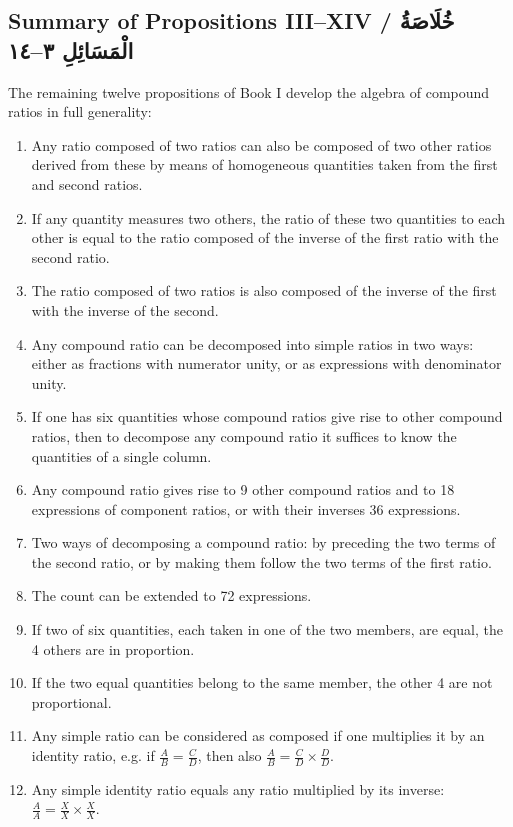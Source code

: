 \documentclass[11pt,a4paper]{article}
\theoremstyle{plain}
\theoremstyle{definition}
\theoremstyle{remark}
\newcommand{\ar}[1]{{\arabicfont\beginR #1\endR}}
\begin{document}
\subsection{Summary of Propositions III--XIV / \ar{خُلَاصَةُ الْمَسَائِلِ ٣--١٤}}
\label{sec:prop3-14}

\noindent The remaining twelve propositions of Book I develop the algebra of
compound ratios in full generality:

\begin{enumerate}[leftmargin=2em]
\item[\textbf{III.}] Any ratio composed of two ratios can also be composed of
two other ratios derived from these by means of homogeneous quantities taken
from the first and second ratios.
\item[\textbf{IV.}] If any quantity measures two others, the ratio of these two
quantities to each other is equal to the ratio composed of the inverse of the
first ratio with the second ratio.
\item[\textbf{V.}] The ratio composed of two ratios is also composed of the
inverse of the first with the inverse of the second.
\item[\textbf{VI.}] Any compound ratio can be decomposed into simple ratios in
two ways: either as fractions with numerator unity, or as expressions with
denominator unity.
\item[\textbf{VII.}] If one has six quantities whose compound ratios give rise
to other compound ratios, then to decompose any compound ratio it suffices to
know the quantities of a single column.
\item[\textbf{VIII.}] Any compound ratio gives rise to 9 other compound ratios
and to 18 expressions of component ratios, or with their inverses 36
expressions.
\item[\textbf{IX.}] Two ways of decomposing a compound ratio: by preceding the
two terms of the second ratio, or by making them follow the two terms of the
first ratio.
\item[\textbf{X.}] The count can be extended to 72 expressions.
\item[\textbf{XI.}] If two of six quantities, each taken in one of the two
members, are equal, the 4 others are in proportion.
\item[\textbf{XII.}] If the two equal quantities belong to the same member, the
other 4 are not proportional.
\item[\textbf{XIII.}] Any simple ratio can be considered as composed if one
multiplies it by an identity ratio, e.g. if $\frac{A}{B} = \frac{C}{D}$, then
also $\frac{A}{B} = \frac{C}{D} \times \frac{D}{D}$.
\item[\textbf{XIV.}] Any simple identity ratio equals any ratio multiplied by
its inverse: $\frac{A}{A} = \frac{X}{X} \times \frac{X}{X}$.
\end{enumerate}
\end{document}
